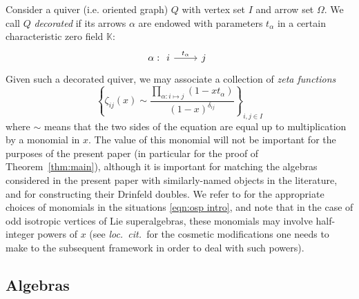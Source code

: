 \documentclass{amsart}
\def\BK{{\mathbb{K}}}
\def\loccit{\emph{loc.~cit.~}}
\begin{document}
Consider a quiver (i.e. oriented graph) $Q$ with vertex set $I$ and arrow set $\Omega$. We call $Q$ \emph{decorated} if its arrows $\alpha$ are endowed with parameters $t_\alpha$ in a certain characteristic zero field $\BK$:
\begin{equation}
\label{eqn:graph}
\alpha : \begin{tikzcd}
i & j
\arrow["t_\alpha", from=1-1, to=1-2]
\end{tikzcd}
\end{equation}
Given such a decorated quiver, we may associate a collection of \emph{zeta functions}
\begin{equation}
\label{eqn:zeta}
\left\{ \zeta_{ij}(x) \sim \frac {\prod_{\alpha : i \mapsto j} (1-xt_{\alpha})}{(1-x)^{\delta_{ij}}} \right\}_{i,j\in I}
\end{equation}
where $\sim$ means that the two sides of the equation are equal up to multiplication by a monomial in $x$. The value of this monomial will not be important for the purposes of the present paper (in particular for the proof of Theorem~\ref{thm:main}), although it is important for matching the algebras considered in the present paper with similarly-named objects in the literature, and for constructing their Drinfeld doubles. We refer to \cite{NT} for the appropriate choices of monomials in the situations \eqref{eqn:osp intro}, and note that in the case of odd isotropic vertices of Lie superalgebras, these monomials may involve half-integer powers of $x$ (see \loccit for the cosmetic modifications one needs to make to the subsequent framework in order to deal with such powers).

\medskip 

\subsection{Algebras}
\label{sub:algebras}
\end{document}
